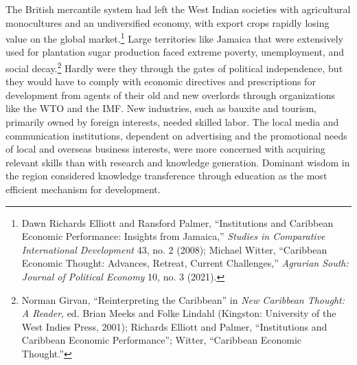 \documentclass{tufte-handout}
\begin{document}
The British mercantile system had left the West Indian societies with
agricultural monocultures and an undiversified economy, with export
crops rapidly losing value on the global market.\footnote{Dawn Richards
  Elliott and Ransford Palmer, ``Institutions and Caribbean Economic
  Performance: Insights from Jamaica,'' \emph{Studies in Comparative
  International Development} 43, no. 2 (2008); Michael Witter,
  ``Caribbean Economic Thought: Advances, Retreat, Current Challenges,''
  \emph{Agrarian South: Journal of Political Economy} 10, no. 3 (2021).}
Large territories like Jamaica that were extensively used for plantation
sugar production faced extreme poverty, unemployment, and social
decay.\footnote{Norman Girvan, ``Reinterpreting the Caribbean'' in
  \emph{New Caribbean Thought: A Reader}, ed. Brian Meeks and Folke
  Lindahl (Kingston: University of the West Indies Press, 2001);
  Richards Elliott and Palmer, ``Institutions and Caribbean Economic
  Performance''; Witter, ``Caribbean Economic Thought.''} Hardly were
they through the gates of political independence, but they would have to
comply with economic directives and prescriptions for development from
agents of their old and new overlords through organizations like the WTO
and the IMF. New industries, such as bauxite and tourism, primarily
owned by foreign interests, needed skilled labor. The local media and
communication institutions, dependent on advertising and the promotional
needs of local and overseas business interests, were more concerned with
acquiring relevant skills than with research and knowledge generation.
Dominant wisdom in the region considered knowledge transference through
education as the most efficient mechanism for development.

\enlargethispage{\baselineskip}
\end{document}

